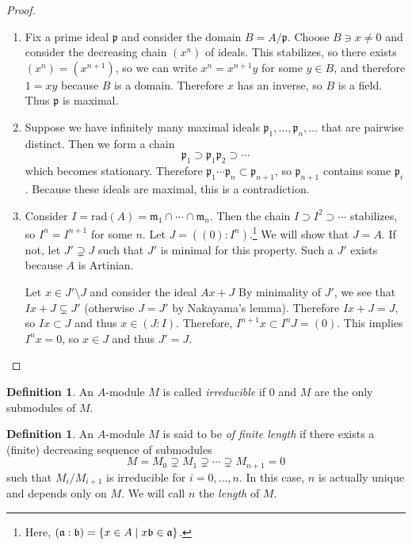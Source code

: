 \documentclass[leqno, openany]{memoir}
\theoremstyle{definition}
\newtheorem{defn}[thm]{Definition}
\theoremstyle{remark}
\theoremstyle{plain}
\theoremstyle{definition}
\theoremstyle{remark}
\newcommand{\mf}[1]{\mathfrak{#1}}
\newcommand{\mr}[1]{\mathrm{#1}}
\begin{document}
\begin{proof} \begin{enumerate} \item Fix a prime ideal $\mf{p}$ and consider
    the domain $B = A / \mf{p}$. Choose $B \ni x \neq 0$ and consider the
    decreasing chain $(x^n)$ of ideals. This stabilizes, so there exists $(x^n)
    = (x^{n+1})$, so we can write $x^n = x^{n+1}y$ for some $y \in B$, and
    therefore $1 = xy$ because $B$ is a domain. Therefore $x$ has an inverse,
    so $B$ is a field. Thus $\mf{p}$ is maximal.  \item Suppose we have
    infinitely many maximal ideals $\mf{p}_1, \ldots, \mf{p}_n, \ldots$ that
    are pairwise distinct. Then we form a chain \[ \mf{p}_1 \supset
    \mf{p}_1\mf{p}_2 \supset \cdots \] which becomes stationary. Therefore
    $\mf{p}_1 \cdots \mf{p}_n \subset \mf{p}_{n+1}$, so $\mf{p}_{n+1}$ contains
    some $\mf{p}_i$. Because these ideals are maximal, this is a contradiction.
\item Consider $I = \mr{rad}(A) = \mf{m}_1 \cap \cdots \cap \mf{m}_n$. Then the
    chain $I \supset I^2 \supset \cdots$ stabilizes, so $I^n = I^{n+1}$ for
    some $n$. Let $J = ((0): I^n)$.\footnote{Here, $(\mf{a}: \mf{b}) = \qty{x
    \in A \mid x\mf{b} \in \mf{a}}$.} We will show that $J = A$. If not, let
    $J' \supsetneq J$ such that $J'$ is minimal for this property. Such a $J'$
    exists because $A$ is Artinian.

            Let $x \in J' \setminus J$ and consider the ideal $Ax + J$ By
    minimality of $J'$, we see that $Ix + J \subsetneq J'$ (otherwise $J = J'$
    by Nakayama's lemma). Therefore $Ix + J = J$, so $Ix \subset J$ and thus $x
    \in (J:I)$. Therefore, $I^{n+1}x \subset I^n J = (0)$. This implies $I^nx =
    0$, so $x \in J$ and thus $J' = J$. \qedhere \end{enumerate} \end{proof}

\begin{defn} An $A$-module $M$ is called \textit{irreducible} if $0$ and $M$
are the only submodules of $M$.  \end{defn}

\begin{defn} An $A$-module $M$ is said to be \textit{of finite length}  if
    there exists a (finite) decreasing sequence of submodules \[ M = M_0
    \supsetneq M_1 \supsetneq \cdots \supsetneq M_{n+1} = 0 \] such that $M_i /
    M_{i+1}$ is irreducible for $i = 0, \ldots, n$. In this case, $n$ is
    actually unique and depends only on $M$. We will call $n$ the
    \textit{length} of $M$.  \end{defn}
\end{document}
